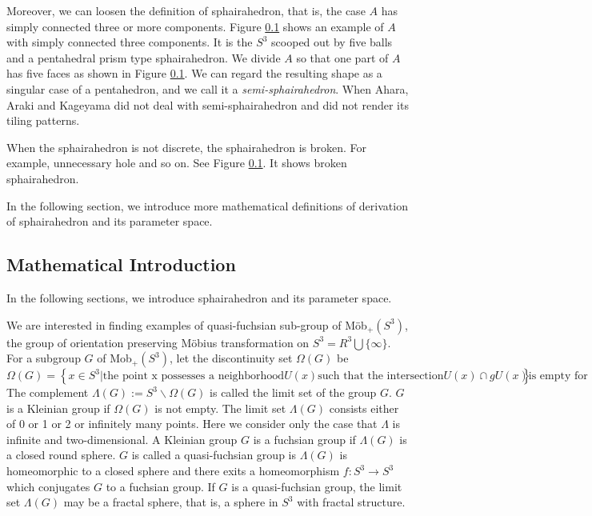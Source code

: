 \documentclass[dvipdfmx]{interact}
\theoremstyle{plain}%
\theoremstyle{definition}
\theoremstyle{remark}
\theoremstyle{problemstyle}
\begin{document}
Moreover, we can loosen the definition of sphairahedron,
that is, the case $A$ has simply connected three or more components.
Figure \ref{}\subref{} shows an
example of $A$ with simply connected three components.
It is the $S^3$ scooped out by five balls and a pentahedral prism type
sphairahedron.
We divide $A$ so that one part of $A$ has five faces as shown in
Figure \ref{}\subref{}.
We can regard the resulting shape as a singular case of a pentahedron,
and we call it a \textit{semi-sphairahedron}.
When Ahara, Araki and Kageyama did not deal with semi-sphairahedron and
did not render its tiling patterns.

When the sphairahedron is not discrete, the sphairahedron is broken.
For example, unnecessary hole and so on.
See Figure \ref{}. It shows broken sphairahedron.

In the following section, we introduce more mathematical definitions of
derivation of sphairahedron and its parameter space.
\subsection{Mathematical Introduction}
In the following sections, we introduce sphairahedron and its parameter space.

We are interested in finding examples of quasi-fuchsian sub-group of
M\"ob$_{+}(S^3)$, the  group of orientation preserving M\"obius
transformation on $S^3 = R^3 \bigcup \{\infty\}$. For a subgroup $G$ of
Mob$_+(S^3)$, let the discontinuity set $\Omega(G)$ be
$$
\Omega(G) = \left\{ x \in S^3 \left| \text{the point x possesses a neighborhood} U(x)
\text{such that the intersection} U(x) \cap gU(x) \text{is empty for all but finite
elements} g\in G \right. \right\}.
$$
The complement $\Lambda(G) := S^3 \backslash \Omega(G)$ is called the
limit set of the group $G$. $G$ is a Kleinian group if $\Omega(G)$ is
not empty. The limit set $\Lambda(G)$ consists either of 0 or 1 or 2 or
infinitely many points. Here we consider only the case that $\Lambda$
is infinite and two-dimensional. A Kleinian group $G$ is a fuchsian
group if $\Lambda(G)$ is a closed round sphere. $G$ is called a
quasi-fuchsian group is $\Lambda(G)$ is homeomorphic to a closed sphere
and there exits a homeomorphism $f:S^3 \rightarrow S^3$ which conjugates
$G$ to a fuchsian group. If $G$ is a quasi-fuchsian group, the limit set
$\Lambda(G)$ may be a fractal sphere, that is, a sphere in $S^3$ with
fractal structure.
\end{document}
